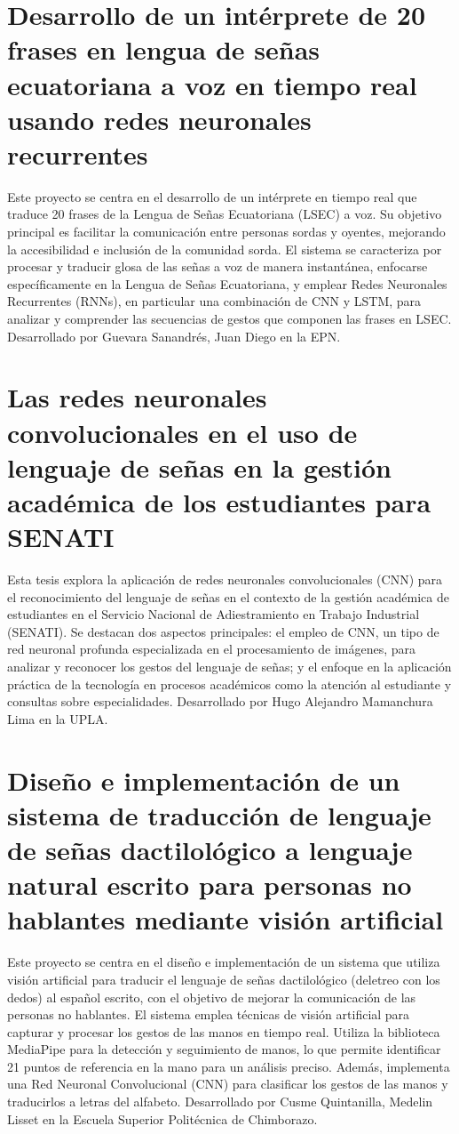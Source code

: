 \section{Desarrollo de un intérprete de 20 frases en lengua de señas ecuatoriana a voz en tiempo real usando redes neuronales recurrentes \cite{ref25}}

Este proyecto se centra en el desarrollo de un intérprete en tiempo real que traduce 20 frases de la Lengua de Señas Ecuatoriana (LSEC) a voz. Su objetivo principal es facilitar la comunicación entre personas sordas y oyentes, mejorando la accesibilidad e inclusión de la comunidad sorda. El sistema se caracteriza por procesar y traducir glosa de las señas a voz de manera instantánea, enfocarse específicamente en la Lengua de Señas Ecuatoriana, y emplear Redes Neuronales Recurrentes (RNNs), en particular una combinación de CNN y LSTM, para analizar y comprender las secuencias de gestos que componen las frases en LSEC.  Desarrollado por Guevara Sanandrés, Juan Diego en la EPN.

\section{Las redes neuronales convolucionales en el uso de lenguaje de señas en la gestión académica de los estudiantes para SENATI \cite{ref26}}

Esta tesis explora la aplicación de redes neuronales convolucionales (CNN) para el reconocimiento del lenguaje de señas en el contexto de la gestión académica de estudiantes en el Servicio Nacional de Adiestramiento en Trabajo Industrial (SENATI). Se destacan dos aspectos principales: el empleo de CNN, un tipo de red neuronal profunda especializada en el procesamiento de imágenes, para analizar y reconocer los gestos del lenguaje de señas; y el enfoque en la aplicación práctica de la tecnología en procesos académicos como la atención al estudiante y consultas sobre especialidades. Desarrollado por Hugo Alejandro Mamanchura Lima en la UPLA.

\section{Diseño e implementación de un sistema de traducción de lenguaje de señas dactilológico a lenguaje natural escrito para personas no hablantes mediante visión artificial \cite{ref27}}

Este proyecto se centra en el diseño e implementación de un sistema que utiliza visión artificial para traducir el lenguaje de señas dactilológico (deletreo con los dedos) al español escrito, con el objetivo de mejorar la comunicación de las personas no hablantes.  El sistema emplea técnicas de visión artificial para capturar y procesar los gestos de las manos en tiempo real.  Utiliza la biblioteca MediaPipe para la detección y seguimiento de manos, lo que permite identificar 21 puntos de referencia en la mano para un análisis preciso. Además, implementa una Red Neuronal Convolucional (CNN) para clasificar los gestos de las manos y traducirlos a letras del alfabeto. Desarrollado por Cusme Quintanilla, Medelin Lisset en la Escuela Superior Politécnica de Chimborazo.

